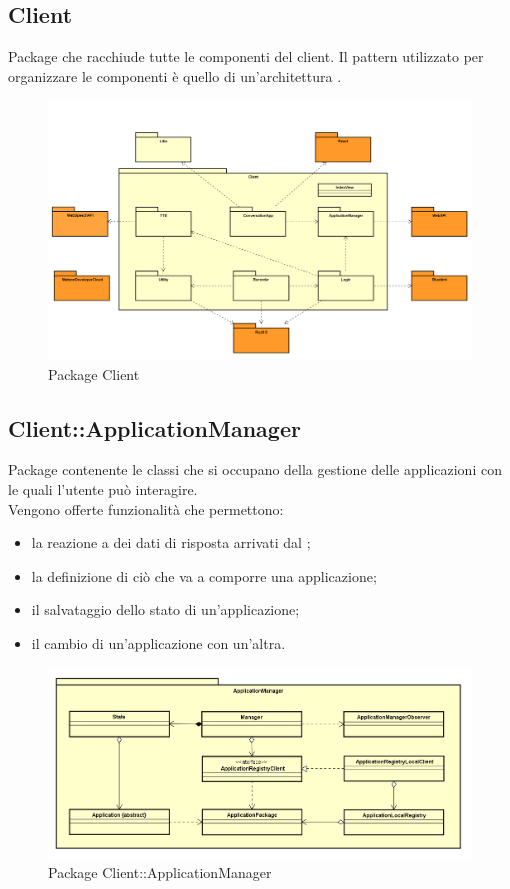 \subsection{Client}
Package che racchiude tutte le componenti del client. Il pattern utilizzato per organizzare le componenti è quello di un'architettura .
\begin{figure}[h] \centering \includegraphics[width=\textwidth,height=\textheight,keepaspectratio]{images/diagrams/client/Client/Client.png}
	\caption{Package Client}
\end{figure}
\newpage


\subsection{Client::ApplicationManager}
Package contenente le classi che si occupano della gestione delle applicazioni con le quali l'utente può interagire.\\ Vengono offerte funzionalità che permettono: \begin{itemize} \item la reazione a dei dati di risposta arrivati dal ; \item la definizione di ciò che va a comporre una applicazione; \item il salvataggio dello stato di un'applicazione; \item il cambio di un'applicazione con un'altra. \end{itemize}
\begin{figure}[h] \centering \includegraphics[width=\textwidth,height=\textheight,keepaspectratio]{images/diagrams/client/Client/ApplicationManager.png}
	\caption{Package Client::ApplicationManager}
\end{figure}
\newpage

